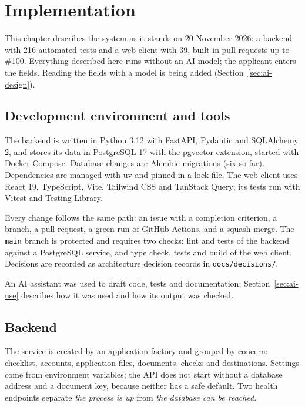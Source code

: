 \chapter{Implementation}\label{ch:implementation}

This chapter describes the system as it stands on 20 November 2026: a backend with 216 automated
tests and a web client with 39, built in pull requests up to \#100. Everything described here runs
without an AI model; the applicant enters the fields. Reading the fields with a model is being
added (Section~\ref{sec:ai-design}).

\section{Development environment and tools}\label{sec:tools}
The backend is written in Python 3.12 with FastAPI, Pydantic and SQLAlchemy 2, and stores its
data in PostgreSQL 17 with the pgvector extension, started with Docker Compose. Database changes
are Alembic migrations (six so far). Dependencies are managed with uv and pinned in a lock file.
The web client uses React 19, TypeScript, Vite, Tailwind CSS and TanStack Query; its tests run
with Vitest and Testing Library.

Every change follows the same path: an issue with a completion criterion, a branch, a pull
request, a green run of GitHub Actions, and a squash merge. The \texttt{main} branch is protected
and requires two checks: lint and tests of the backend against a PostgreSQL service, and type
check, tests and build of the web client. Decisions are recorded as architecture decision records
in \texttt{docs/decisions/}.

An AI assistant was used to draft code, tests and documentation; Section~\ref{sec:ai-use}
describes how it was used and how its output was checked.

\section{Backend}
The service is created by an application factory and grouped by concern: checklist, accounts,
application files, documents, checks and destinations. Settings come from environment variables;
the API does not start without a database address and a document key, because neither has a safe
default. Two health endpoints separate \emph{the process is up} from \emph{the database can be
reached}.


